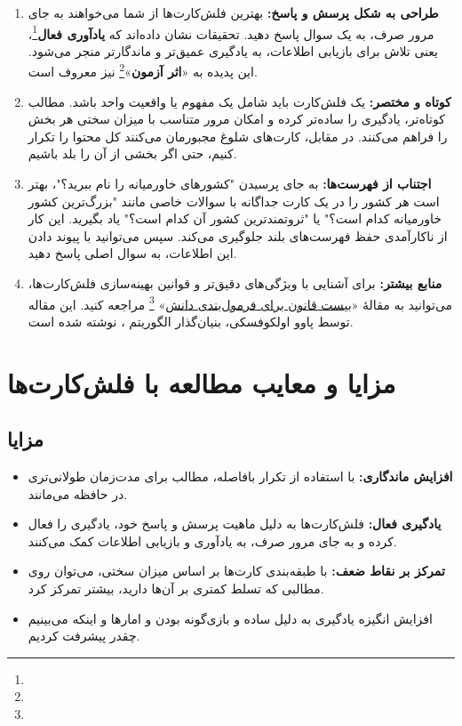 \documentclass[12pt]{report}
\begin{document}
\begin{enumerate}
    \item \textbf{طراحی به شکل پرسش و پاسخ:} بهترین فلش‌کارت‌ها از شما می‌خواهند به جای مرور صرف، به یک سوال پاسخ دهید. تحقیقات نشان داده‌اند که \textbf{یادآوری فعال}\footnote{}، یعنی تلاش برای بازیابی اطلاعات، به یادگیری عمیق‌تر و ماندگارتر منجر می‌شود. این پدیده به «\textbf{اثر آزمون}»\footnote{} نیز معروف است.

    \item \textbf{کوتاه و مختصر:} یک فلش‌کارت باید شامل یک مفهوم یا واقعیت واحد باشد. مطالب کوتاه‌تر، یادگیری را ساده‌تر کرده و امکان مرور متناسب با میزان سختی هر بخش را فراهم می‌کنند. در مقابل، کارت‌های شلوغ مجبورمان می‌کنند کل محتوا را تکرار کنیم، حتی اگر بخشی از آن را بلد باشیم.

    \item \textbf{اجتناب از فهرست‌ها:} به جای پرسیدن "کشورهای خاورمیانه را نام ببرید؟"، بهتر است هر کشور را در یک کارت جداگانه با سوالات خاصی مانند "بزرگ‌ترین کشور خاورمیانه کدام است؟" یا "ثروتمندترین کشور آن کدام است؟" یاد بگیرید. این کار از ناکارآمدی حفظ فهرست‌های بلند جلوگیری می‌کند. سپس می‌توانید با پیوند دادن این اطلاعات، به سوال اصلی پاسخ دهید.
    
    \item \textbf{منابع بیشتر:} برای آشنایی با ویژگی‌های دقیق‌تر و قوانین بهینه‌سازی فلش‌کارت‌ها، می‌توانید به مقالهٔ 
    «\href{https://super-memory.com/articles/20rules.htm}{بیست قانون برای فرمول‌بندی دانش}»
\footnote{}
    مراجعه کنید. این مقاله توسط پاوو اولکوفسکی، بنیان‌گذار الگوریتم ، نوشته شده است.
\end{enumerate}

\section{مزایا و معایب مطالعه با فلش‌کارت‌ها}


\subsection{مزایا}
\begin{itemize}
    \item \textbf{افزایش ماندگاری:} با استفاده از تکرار بافاصله، مطالب برای مدت‌زمان طولانی‌تری در حافظه می‌مانند.
    \item \textbf{یادگیری فعال:} فلش‌کارت‌ها به دلیل ماهیت پرسش و پاسخ خود، یادگیری را فعال کرده و به جای مرور صرف، به یادآوری و بازیابی اطلاعات کمک می‌کنند.
    \item \textbf{تمرکز بر نقاط ضعف:} با طبقه‌بندی کارت‌ها بر اساس میزان سختی، می‌توان روی مطالبی که تسلط کمتری بر آن‌ها دارید، بیشتر تمرکز کرد.
    \item افزایش انگیزه یادگیری به دلیل ساده و بازی‌گونه بودن و امارها و اینکه می‌بینیم چقدر پیشرفت کردیم.
\end{itemize}
\end{document}

